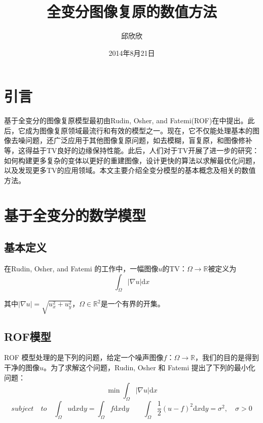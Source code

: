 \documentclass[a4paper,12pt]{article}
\title{全变分图像复原的数值方法}
\author{邱欣欣}
\date{2014年8月21日}
\begin{document}
\maketitle

\section{引言}
基于全变分的图像复原模型最初由Rudin, Osher, and Fatemi(ROF)在\cite{Rudin:1992ro}中提出。此后，它成为图像复原领域最流行和有效的模型之一。现在，它不仅能处理基本的图像去噪问题，还广泛应用于其他图像复原问题，如去模糊，盲复原，和图像修补等，这得益于TV良好的边缘保持性能。此后，人们对于TV开展了进一步的研究：如何构建更多复杂的变体以更好的重建图像，设计更快的算法以求解最优化问题，以及发现更多TV的应用领域。本文主要介绍全变分模型的基本概念及相关的数值方法。

\section{基于全变分的数学模型}

\subsection{基本定义}
在Rudin, Osher, and Fatemi 的工作\cite{Rudin:1992ro}中，一幅图像$u$的TV：$\Omega\rightarrow\mathbb{R}$被定义为
\newcommand{\ud}{\mathrm{d}}
\begin{displaymath}
\int_{\Omega}|\nabla u| \ud x 
\end{displaymath}

其中$|\nabla u|=\sqrt{u_x^2+u_y^2}$，$\Omega\in \mathbb{R}^2$是一个有界的开集。

\subsection{ROF模型}

%

ROF 模型处理的是下列的问题，给定一个噪声图像$f$：$\Omega\rightarrow\mathbb{R}$，我们的目的是得到干净的图像$u$。为了求解这个问题，Rudin, Osher 和 Fatemi 提出了下列的最小化问题：
\begin{displaymath}
\min \int_{\Omega}|\nabla u| \ud x
\end{displaymath}
\begin{displaymath}
subject\quad to \quad  \int_{\Omega}u \ud x\ud y=\int_{\Omega}f \ud x\ud y\qquad  \int_{\Omega}\frac{1}{2}(u-f)^2 \ud x\ud y=\sigma^2,\quad \sigma>0
\end{displaymath}
\end{document}
